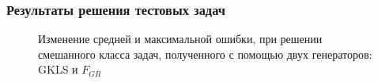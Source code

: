 \documentclass[aspectratio=1610]{beamer}
\begin{document}
\begin{frame}
  \frametitle{Результаты решения тестовых задач}
  \begin{figure}[ht]
    \vspace*{-0.5cm}
      \centering
      \caption{Изменение средней и максимальной ошибки, при решении смешанного класса задач, 
      полученного с помощью двух генераторов: GKLS и \(F_{GR}\)}
      \label{fig:devs_mixed}
  \end{figure}
\end{frame}
\end{document}
